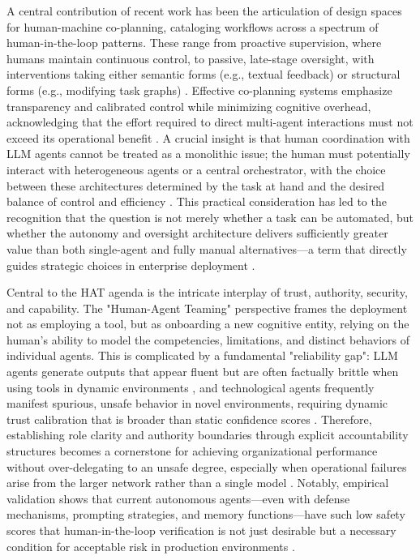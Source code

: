 \documentclass[11pt,a4paper]{article}
\begin{document}
A central contribution of recent work has been the articulation of design spaces for human-machine co-planning, cataloging workflows across a spectrum of human-in-the-loop patterns. These range from proactive supervision, where humans maintain continuous control, to passive, late-stage oversight, with interventions taking either semantic forms (e.g., textual feedback) or structural forms (e.g., modifying task graphs) \cite{arxiv:2505.00753v5}. Effective co-planning systems emphasize transparency and calibrated control while minimizing cognitive overhead, acknowledging that the effort required to direct multi-agent interactions must not exceed its operational benefit \cite{arxiv:2505.00753v5}. A crucial insight is that human coordination with LLM agents cannot be treated as a monolithic issue; the human must potentially interact with heterogeneous agents or a central orchestrator, with the choice between these architectures determined by the task at hand and the desired balance of control and efficiency \cite{arxiv:2505.00753v5}. This practical consideration has led to the recognition that the question is not merely whether a task can be automated, but whether the autonomy and oversight architecture delivers sufficiently greater value than both single-agent and fully manual alternatives---a term that directly guides strategic choices in enterprise deployment \cite{arxiv:2505.17767v2}.

Central to the HAT agenda is the intricate interplay of trust, authority, security, and capability. The "Human-Agent Teaming" perspective frames the deployment not as employing a tool, but as onboarding a new cognitive entity, relying on the human's ability to model the competencies, limitations, and distinct behaviors of individual agents. This is complicated by a fundamental "reliability gap": LLM agents generate outputs that appear fluent but are often factually brittle when using tools in dynamic environments \cite{arxiv:2604.03870v1}, and technological agents frequently manifest spurious, unsafe behavior in novel environments, requiring dynamic trust calibration that is broader than static confidence scores \cite{arxiv:2412.14470v2}. Therefore, establishing role clarity and authority boundaries through explicit accountability structures becomes a cornerstone for achieving organizational performance without over-delegating to an unsafe degree, especially when operational failures arise from the larger network rather than a single model \cite{arxiv:2605.24309v1}. Notably, empirical validation shows that current autonomous agents---even with defense mechanisms, prompting strategies, and memory functions---have such low safety scores that human-in-the-loop verification is not just desirable but a necessary condition for acceptable risk in production environments \cite{arxiv:2412.14470v2}.
\end{document}
